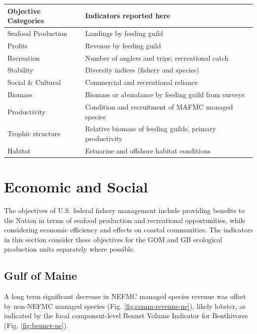 \documentclass[10pt,]{article}
\let\origtable\table
\let\endorigtable\endtable
\renewenvironment{table}[1][2] {
    \expandafter\origtable\expandafter[H]
} {
    \endorigtable
}
\begin{document}
\begin{table}[!h]

\caption{\label{tab:management-objectives}Established ecosystem-scale objectives in New England}
\centering
\begin{tabular}{ll}
\toprule
\textbf{Objective Categories} & \textbf{Indicators reported here}\\
\midrule
Seafood Production & Landings by feeding guild\\
Profits & Revenue by feeding guild\\
Recreation & Number of anglers and trips; recreational catch\\
Stability & Diversity indices (fishery and species)\\
Social \& Cultural & Commercial and recreational reliance\\
\addlinespace
Biomass & Biomass or abundance by feeding guild from surveys\\
Productivity & Condition and recruitment of MAFMC managed species\\
Trophic structure & Relative biomass of feeding guilds, primary productivity\\
Habitat & Estuarine and offshore habitat conditions\\
\bottomrule
\end{tabular}
\end{table}

\section{Economic and Social}\label{economic-and-social}

The objectives of U.S. federal fishery management include providing
benefits to the Nation in terms of seafood production and recreational
opportunities, while considering economic efficiency and effects on
coastal communities. The indicators in this section consider these
objectives for the GOM and GB ecological production units separately
where possible.

\subsection{Gulf of Maine}\label{gulf-of-maine}

A long term significant decrease in NEFMC managed species revenue was
offset by non-NEFMC managed species (Fig. \ref{fig:comm-revenue-ne}),
likely lobster, as indicated by the focal component-level Bennet Volume
Indicator for Benthivores (Fig. \ref{fig:bennet-ne}).
\end{document}
